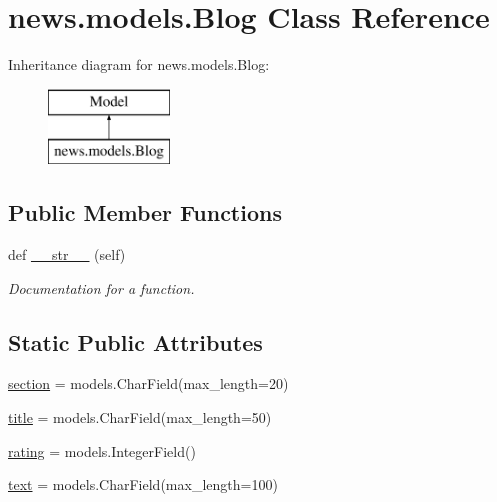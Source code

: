 \hypertarget{classnews_1_1models_1_1_blog}{}\section{news.\+models.\+Blog Class Reference}
\label{classnews_1_1models_1_1_blog}
Inheritance diagram for news.\+models.\+Blog\+:\begin{figure}[H]
\begin{center}
\leavevmode
\includegraphics[height=2.000000cm]{classnews_1_1models_1_1_blog}
\end{center}
\end{figure}
\subsection*{Public Member Functions}
\begin{DoxyCompactItemize}
\item 
def \mbox{\hyperlink{classnews_1_1models_1_1_blog_a5cf49bbf405b3dfcbbe79905827ee3e7}{\+\_\+\+\_\+str\+\_\+\+\_\+}} (self)
\begin{DoxyCompactList}\small\item\em Documentation for a function. \end{DoxyCompactList}\end{DoxyCompactItemize}
\subsection*{Static Public Attributes}
\begin{DoxyCompactItemize}
\item 
\mbox{\hyperlink{classnews_1_1models_1_1_blog_a0ce1740083f2e95fa0d6709b795a2be3}{section}} = models.\+Char\+Field(max\+\_\+length=20)
\item 
\mbox{\hyperlink{classnews_1_1models_1_1_blog_a6adf7861b13c6898f5b74d18e91bf8c7}{title}} = models.\+Char\+Field(max\+\_\+length=50)
\item 
\mbox{\hyperlink{classnews_1_1models_1_1_blog_a44b6e01f0f7ca6ae9bd23477755efc81}{rating}} = models.\+Integer\+Field()
\item 
\mbox{\hyperlink{classnews_1_1models_1_1_blog_aee461adb8edec4537b75b01175074aba}{text}} = models.\+Char\+Field(max\+\_\+length=100)
\end{DoxyCompactItemize}


